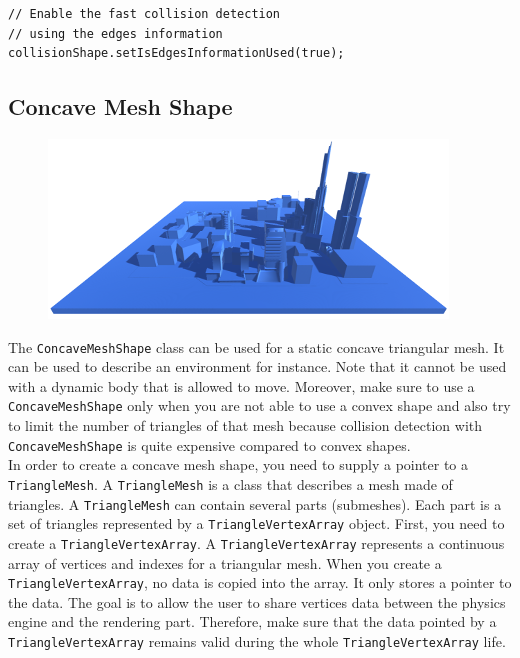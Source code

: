\documentclass[a4paper,12pt]{article}
\begin{document}
     \begin{lstlisting}
// Enable the fast collision detection
// using the edges information
collisionShape.setIsEdgesInformationUsed(true);
  \end{lstlisting}

  \subsection{Concave Mesh Shape}

  \begin{figure}[h]
      \centering
      \includegraphics{concavemeshshape.png}
      \label{fig:concaveshape}
  \end{figure}

  The \texttt{ConcaveMeshShape} class can be used for a static concave triangular mesh. It can be used to describe an environment for
  instance. Note that it cannot be used with a dynamic body that is allowed to move. Moreover, make sure to use a \texttt{ConcaveMeshShape} only
  when you are not able to use a convex shape and also try to limit the number of triangles of that mesh because collision detection
  with \texttt{ConcaveMeshShape} is quite expensive compared to convex shapes. \\

  In order to create a concave mesh shape, you need to supply a pointer to a \texttt{TriangleMesh}. A \texttt{TriangleMesh} is a class
  that describes a mesh made of triangles. A \texttt{TriangleMesh} can contain several parts (submeshes). Each part is a set of
  triangles represented by a \texttt{TriangleVertexArray} object. First, you need to create a \texttt{TriangleVertexArray}. A \texttt{TriangleVertexArray} represents
  a continuous array of vertices and indexes for a triangular mesh. When you create a \texttt{TriangleVertexArray}, no data is copied
  into the array. It only stores a pointer to the data. The goal is to allow the user to share vertices data between the physics engine and the rendering
  part. Therefore, make sure that the data pointed by a \texttt{TriangleVertexArray} remains valid during the whole \texttt{TriangleVertexArray} life.
  \\
\end{document}
